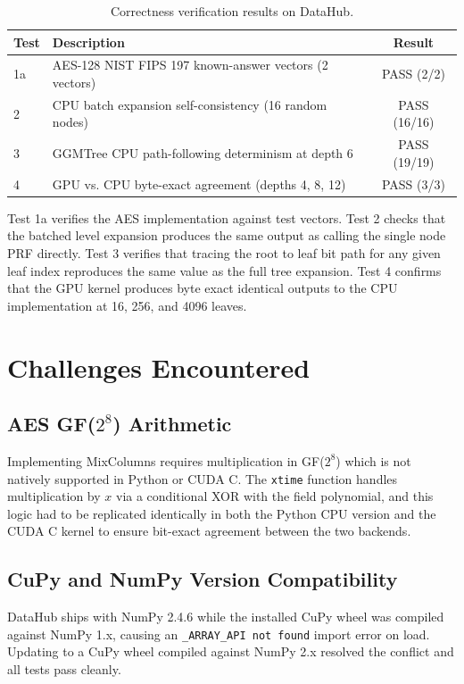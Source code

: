 \documentclass[12pt]{article}
\begin{document}
\begin{table}[H]
\centering
\begin{tabular}{llc}
\toprule
\textbf{Test} & \textbf{Description} & \textbf{Result} \\
\midrule
1a & AES-128 NIST FIPS 197 known-answer vectors (2 vectors) & PASS (2/2) \\
2  & CPU batch expansion self-consistency (16 random nodes) & PASS (16/16) \\
3  & GGMTree CPU path-following determinism at depth 6      & PASS (19/19) \\
4  & GPU vs. CPU byte-exact agreement (depths 4, 8, 12)     & PASS (3/3) \\
\bottomrule
\end{tabular}
\caption{Correctness verification results on DataHub.}
\label{tab:verify}
\end{table}

Test 1a verifies the AES implementation against test vectors. Test 2 checks that the batched level expansion produces the same output as calling the single node PRF directly. Test 3 verifies that tracing the root to leaf bit path for any given leaf index reproduces the same value as the full tree expansion. Test 4 confirms that the GPU kernel produces byte exact identical outputs to the CPU implementation at 16, 256, and 4096 leaves.

\section{Challenges Encountered}

\subsection{AES GF($2^8$) Arithmetic}

Implementing MixColumns requires multiplication in GF($2^8$) which is not natively supported in Python or CUDA C. The \texttt{xtime} function handles multiplication by $x$ via a conditional XOR with the field polynomial, and this logic had to be replicated identically in both the Python CPU version and the CUDA C kernel to ensure bit-exact agreement between the two backends.

\subsection{CuPy and NumPy Version Compatibility}

DataHub ships with NumPy 2.4.6 while the installed CuPy wheel was compiled against NumPy 1.x, causing an \texttt{\_ARRAY\_API not found} import error on load. Updating to a CuPy wheel compiled against NumPy 2.x resolved the conflict and all tests pass cleanly.
\end{document}

